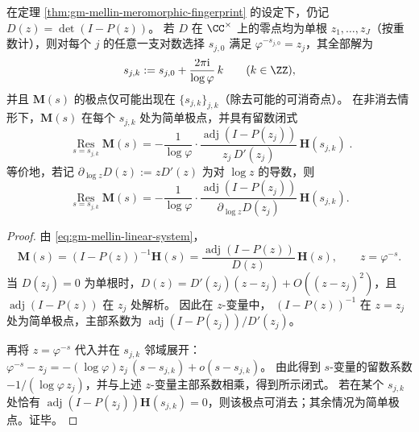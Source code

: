 \begin{proposition}\label{prop:gm-mellin-pole-skeleton-residue-adjugate}
在定理 \ref{thm:gm-mellin-meromorphic-fingerprint} 的设定下，仍记 \(D(z)=\det(I-P(z))\)。
若 \(D\) 在 \(\CC^\times\) 上的零点均为单根 \(z_1,\dots,z_J\)（按重数计），则对每个 \(j\) 的任意一支对数选择 \(s_{j,0}\) 满足 \(\varphi^{-s_{j,0}}=z_j\)，其全部解为
\[
s_{j,k}:=s_{j,0}+\frac{2\pi\mathrm{i}}{\log\varphi}\,k\qquad(k\in\ZZ),
\]
并且 \(\mathbf{M}(s)\) 的极点仅可能出现在 \(\{s_{j,k}\}_{j,k}\)（除去可能的可消奇点）。
在非消去情形下，\(\mathbf{M}(s)\) 在每个 \(s_{j,k}\) 处为简单极点，并具有留数闭式
\[
\boxed{\;
\operatorname*{Res}_{s=s_{j,k}}\mathbf{M}(s)
=-\frac{1}{\log\varphi}\cdot
\frac{\operatorname{adj}(I-P(z_j))}{z_j\,D'(z_j)}\,
\mathbf{H}(s_{j,k})\; }.
\]
等价地，若记 \(\partial_{\log z}D(z):=zD'(z)\) 为对 \(\log z\) 的导数，则
\[
\operatorname*{Res}_{s=s_{j,k}}\mathbf{M}(s)
=-\frac{1}{\log\varphi}\cdot
\frac{\operatorname{adj}(I-P(z_j))}{\partial_{\log z}D(z_j)}\,
\mathbf{H}(s_{j,k}).
\]
\end{proposition}
\begin{proof}
由 \eqref{eq:gm-mellin-linear-system}，
\[
\mathbf{M}(s)=(I-P(z))^{-1}\mathbf{H}(s)=\frac{\operatorname{adj}(I-P(z))}{D(z)}\,\mathbf{H}(s),
\qquad z=\varphi^{-s}.
\]
当 \(D(z_j)=0\) 为单根时，\(D(z)=D'(z_j)(z-z_j)+O((z-z_j)^2)\)，且 \(\operatorname{adj}(I-P(z))\) 在 \(z_j\) 处解析。
因此在 \(z\)-变量中，
\(
(I-P(z))^{-1}
\)
在 \(z=z_j\) 处为简单极点，主部系数为 \(\operatorname{adj}(I-P(z_j))/D'(z_j)\)。
\par
再将 \(z=\varphi^{-s}\) 代入并在 \(s_{j,k}\) 邻域展开：
\(
\varphi^{-s}-z_j=-(\log\varphi)z_j\,(s-s_{j,k})+o(s-s_{j,k})
\)。
由此得到 \(s\)-变量的留数系数 \(-1/(\log\varphi\,z_j)\)，并与上述 \(z\)-变量主部系数相乘，得到所示闭式。
若在某个 \(s_{j,k}\) 处恰有 \(\operatorname{adj}(I-P(z_j))\mathbf{H}(s_{j,k})=0\)，则该极点可消去；其余情况为简单极点。证毕。
\end{proof}

